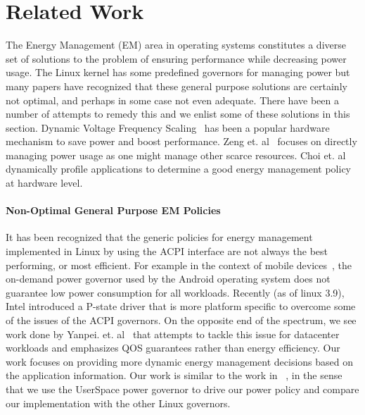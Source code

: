 \section{Related Work}\label{sec:rel}

The Energy Management (EM) area in operating systems constitutes a diverse set of solutions to the problem of ensuring performance while decreasing power usage. 
The Linux kernel has some predefined governors for managing power but many papers have recognized that these general purpose solutions are certainly not optimal, 
and perhaps in some case not even adequate. 
There have been a number of attempts to remedy this and we enlist some of these solutions in this section. Dynamic Voltage Frequency Scaling~\cite{dvfs} has been a 
popular hardware mechanism to save power and boost performance. Zeng et. al~\cite{ecos} focuses on directly managing power usage as one might manage other scarce resources. 
Choi et. al~\cite{decomp} dynamically profile applications to determine a good energy management policy at hardware level. 

\paragraph{Non-Optimal General Purpose EM Policies} It has been recognized that the generic policies for energy management 
implemented in Linux by using the ACPI interface are not always the best performing, or most efficient. For example in the 
context of mobile devices~\cite{and-dvfs}, the on-demand power governor used by the Android operating system does not guarantee 
low power consumption for all workloads. Recently (as of linux 3.9), Intel introduced a P-state driver that is more platform specific 
to overcome some of the issues of the ACPI governors. On the opposite end of the spectrum, we see work done by Yanpei. et. al~\cite{sleepscale} that 
attempts to tackle this issue for datacenter workloads and emphasizes QOS guarantees rather than energy efficiency. Our work focuses on 
providing more dynamic energy management decisions based on the application information. Our work is similar to the work 
in ~\cite{and-dvfs}, in the sense that we use the UserSpace power governor to drive our power policy and compare our implementation with 
the other Linux governors. 


